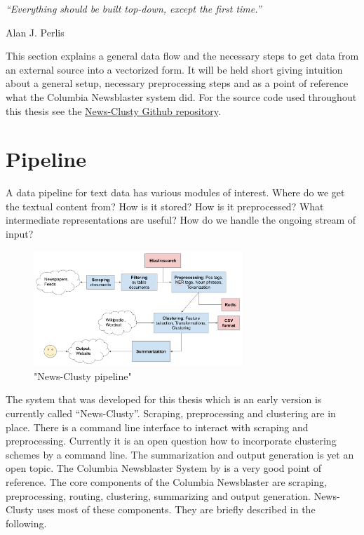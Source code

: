 \epigraph{\emph{
  ``Everything should be built top-down, except the first time.''
}}{ Alan J. Perlis }
 
This section explains a general data flow and the necessary steps to get data from an external source into a vectorized form. It will be held short giving intuition about a general setup, necessary preprocessing steps and as a point of reference what the Columbia Newsblaster system did. For the source code used throughout this thesis see the \href{https://github.com/sacry-/text-mining-haw-bachelor/}{News-Clusty Github repository}.

\section{Pipeline}
\label{sec:pipeline}
  
  A data pipeline for text data has various modules of interest. Where do we get the textual content from? How is it stored? How is it preprocessed? What intermediate representations are useful? How do we handle the ongoing stream of input?

  \begin{figure}[h!]
    \centering
      \includegraphics[width=0.7\textwidth]{news_clusty.png}
      \caption{"News-Clusty pipeline"}
      \label{news_clusty}
  \end{figure}

  The system that was developed for this thesis which is an early version is currently called ``News-Clusty''. Scraping, preprocessing and clustering are in place. There is a command line interface to interact with scraping and preprocessing. Currently it is an open question how to incorporate clustering schemes by a command line. The summarization and output generation is yet an open topic. The Columbia Newsblaster System by \cite{ColumbiaMultiDoc2001} is a very good point of reference. The core components of the Columbia Newsblaster are scraping, preprocessing, routing, clustering, summarizing and output generation. News-Clusty uses most of these components. They are briefly described in the following.

